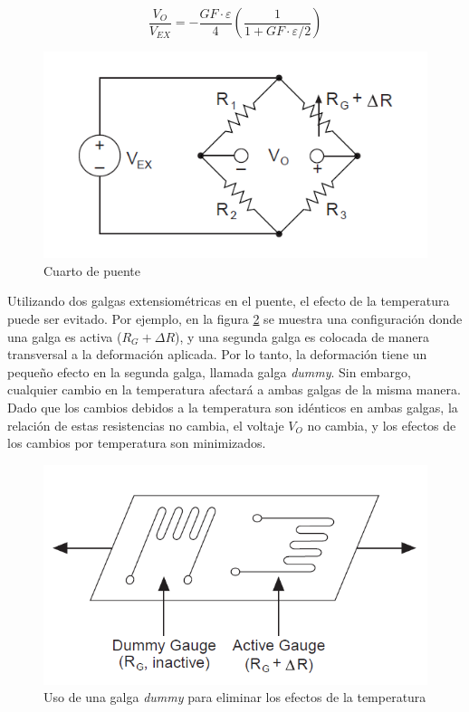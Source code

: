 \begin{equation}\label{eq:vovex}
\frac{V_O}{V_{EX}} = - \frac{GF\cdot \varepsilon}{4} \left( \frac{1}{1+GF\cdot\varepsilon/2} \right)
\end{equation}

\begin{figure}[!h]
\centering
\includegraphics[scale=0.55]{src/ch2/quarter_bridge.png}
\caption{Cuarto de puente}
\label{fig:quarter_bridge}
\end{figure}

Utilizando dos galgas extensiométricas en el puente, el efecto de la temperatura puede ser 
evitado. Por ejemplo, en la figura \ref{fig:dummy_gauge} se muestra una configuración donde 
una galga es activa ($R_G + \Delta R$), y una segunda galga es colocada de manera transversal 
a la deformación aplicada. Por lo tanto, la deformación tiene un pequeño efecto en la segunda 
galga, llamada galga \textit{dummy}. Sin embargo, cualquier cambio en la temperatura afectará 
a ambas galgas de la misma manera. Dado que los cambios debidos a la temperatura son idénticos 
en ambas galgas, la relación de estas resistencias no cambia, el voltaje $V_O$ no cambia, 
y los efectos de los cambios por temperatura son minimizados. ~\cite{gageNI} \\

\begin{figure}[!htb]
\centering
\includegraphics[scale=0.55]{src/ch2/dummy_gauge.png}
\caption{Uso de una galga \textit{dummy} para eliminar los efectos de la temperatura}
\label{fig:dummy_gauge}
\end{figure}

